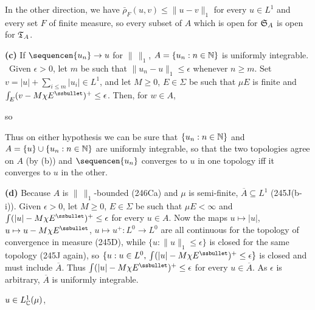 {\medskip

 In the other direction, we have
$\bar\rho_F(u,v)\le\|u-v\|_1$
for every $u\in L^1$ and every set $F$ of finite measure, so every
subset of $A$ which is open for $\frak S_A$ is open for $\frak T_A$.

\medskip

{\bf (c)} If $\sequencen{u_n}\to u$ for $\|\,\|_1$,
$A=\{u_n:n\in\Bbb N\}$ is uniformly integrable.   \Prf\ Given
$\epsilon>0$, let $m$ be such that $\|u_n-u\|_1\le\epsilon$ whenever
$n\ge m$.   Set $v=|u|+\sum_{i\le m}|u_i|\in L^1$, and let $M\ge 0$,
$E\in\Sigma$ be such that $\mu E$ is finite and
$\int_E(v-M\chi E^{\ssbullet})^+\le\epsilon$.   Then, for $w\in A$,


\noindent so


Thus on either hypothesis we can be sure that $\{u_n:n\in\Bbb N\}$ and
$A=\{u\}\cup\{u_n:n\in\Bbb N\}$ are uniformly integrable, so that the
two topologies agree on $A$ (by (b)) and $\sequencen{u_n}$ converges to
$u$ in one topology iff it converges to $u$ in the other.

\medskip

{\bf (d)} Because $A$ is $\|\,\|_1$-bounded (246Ca) and $\mu$ is
semi-finite, $\overline{A}\subseteq L^1$ (245J(b-i)).   Given
$\epsilon>0$, let $M\ge 0$, $E\in\Sigma$ be such that $\mu E<\infty$ and
$\int(|u|-M\chi E^{\ssbullet})^+\le\epsilon$ for every $u\in A$.   Now
the maps $u\mapsto|u|$, $u\mapsto u-M\chi E^{\ssbullet}$,
$u\mapsto u^+:L^0\to L^0$
are all continuous for the topology of convergence in
measure (245D), while $\{u:\|u\|_1\le\epsilon\}$ is closed for the same
topology (245J again), so $\{u:u\in L^0,\,\int(|u|-M\chi
E^{\ssbullet})^+\le\epsilon\}$ is closed and must include
$\overline{A}$.   Thus $\int(|u|-M\chi E^{\ssbullet})^+\le\epsilon$ for
every $u\in\overline{A}$.   As $\epsilon$ is arbitrary, $\overline{A}$
is uniformly integrable.
}%

 $u\in L^1_{\Bbb C}(\mu)$,

